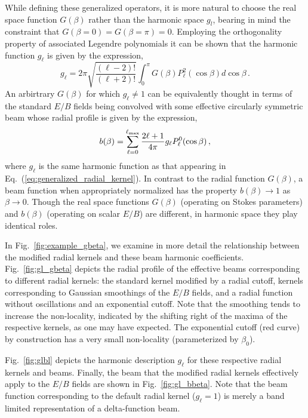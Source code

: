 \documentclass[a4paper,11pt]{article}
\newcommand{\beq}{\begin{equation}}
\newcommand{\eeq}{\end{equation}}
\def\eq#1{{Eq.~(\ref{#1})}}
\def\fig#1{{Fig.~\ref{#1}}}
\begin{document}
While defining these generalized operators, it is more natural to choose the real space function $G(\beta)$ rather than the harmonic space $g_l$, bearing in mind the constraint that $G(\beta=0)=G(\beta=\pi)=0$. Employing the orthogonality property of associated Legendre polynomials it can be shown that the harmonic function $g_{\ell}$ is given by the expression,
%
\beq
g_{\ell} = 2 \pi \sqrt{\frac{(\ell-2)!}{(\ell+2)!}} \int _{0}^{\pi} G(\beta) P_{\ell}^{2}(\cos{\beta}) d\cos{\beta} \,. \label{eq:gb2bl}
\eeq
%
An arbirtrary $G(\beta)$ for which $g_{\ell} \neq 1$ can be equivalently thought in terms of the standard $E/B$ fields being convolved with some effective circularly symmetric beam whose radial profile is given by the expression,
%
\beq
b(\beta) = \sum_{\ell=0}^{\ell_{\rm max}} \frac{2 \ell+1}{4 \pi} g_{\ell} P_{\ell}^{0} (\cos{\beta})\,,
\eeq
%
where $g_{\ell}$ is the same harmonic function as that appearing in \eq{eq:generalized_radial_kernel}.
In contrast to the radial function $G(\beta)$, a beam function when appropriately normalized has the property $b(\beta) \rightarrow 1$ as $\beta \rightarrow 0$. Though the real space functions $G(\beta)$ (operating on Stokes parameters) and $b(\beta)$ (operating on scalar $E/B$) are different, in harmonic space they play identical roles.

In \fig{fig:example_gbeta}, we examine in more detail the relationship between the modified radial kernels and these beam harmonic coefficients.  
 \fig{fig:gl_gbeta} depicts the radial profile of the  effective beams corresponding to different radial kernels: the standard kernel modified by a radial cutoff, kernels corresponding to Gaussian smoothings of the $E/B$ fields, and a radial function without oscillations and an exponential cutoff.  Note that the smoothing tends to increase the non-locality, indicated by the shifting right of the maxima of the respective kernels, as one may have expected.  The exponential cutoff (red curve) by construction has a very small non-locality (parameterized by $\beta_0$).

\fig{fig:glbl} depicts the harmonic description $g_{\ell}$ for these respective radial kernels and beams.
Finally, the beam that the modified radial kernels effectively apply to the $E/B$ fields are shown in \fig{fig:gl_bbeta}.  Note that the beam function corresponding to the default radial kernel ($g_{\ell}=1$) is merely a band limited representation of a delta-function beam.
\end{document}
